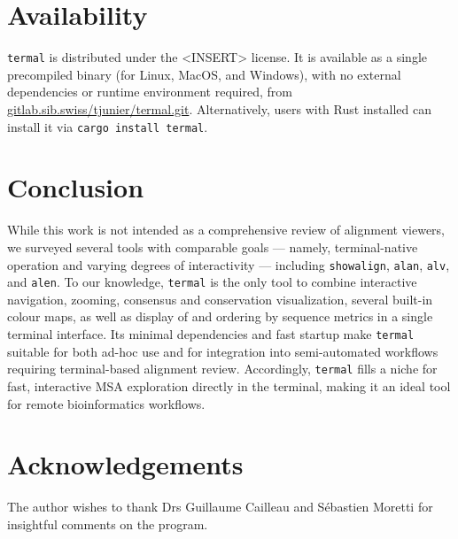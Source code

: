 \documentclass[11pt]{article}
\begin{document}
\section*{Availability}

\texttt{termal} is distributed under the <INSERT> license. It is available as a
single precompiled binary (for Linux, MacOS, and Windows), with no external
dependencies or runtime environment required, from
\url{gitlab.sib.swiss/tjunier/termal.git}. Alternatively, users with Rust
installed can install it via \texttt{cargo install termal}.

\section*{Conclusion}

While this work is not intended as a comprehensive review of alignment viewers,
we surveyed several tools with comparable goals — namely, terminal-native
operation and varying degrees of interactivity — including \texttt{showalign},
\texttt{alan}, \texttt{alv}, and \texttt{alen}.  To our knowledge,
\texttt{termal} is the only tool to combine interactive navigation, zooming,
consensus and conservation visualization, several built-in colour maps, as well
as display of and ordering by sequence metrics in a single terminal interface.
Its minimal dependencies and fast startup make \texttt{termal} suitable for both
ad-hoc use and for integration into semi-automated workflows requiring
terminal-based alignment review. Accordingly, \texttt{termal} fills a niche for
fast, interactive MSA exploration directly in the terminal, making it an ideal
tool for remote bioinformatics workflows.

\section*{Acknowledgements}

The author wishes to thank Drs Guillaume Cailleau and Sébastien Moretti for
insightful comments on the program.


\end{document}

